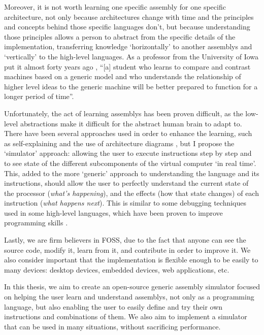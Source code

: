 Moreover, it is not worth learning one specific \gls{assembly} for one specific architecture, not only because architectures change with time and the principles and concepts behind those specific languages don't, but because understanding those principles allows a person to abstract from the specific details of the implementation, transferring knowledge `horizontally' to another \glspl{assembly} and `vertically' to the \glspl{high-level language}. As a professor from the University of Iowa put it almost forty years ago \parencite{DeckerWilliamF.1985Amat}, ``[a] student who learns to compare and contrast machines based on a generic model and who understands the relationship of higher level ideas to the generic machine will be better prepared to function for a longer period of time''.


Unfortunately, the act of learning \glspl{assembly} has been proven difficult, as the low-level abstractions make it difficult for the abstract human brain to adapt to. There have been several approaches used in order to enhance the learning, such as self-explaining and the use of architecture diagrams  \parencite{HungY.-C2012CSWC}, but I propose the `simulator' approach: allowing the user to execute instructions step by step and to see state of the different subcomponents of the virtual \gls{computer} `in real time'. This, added to the more `generic' approach to understanding the language and its instructions, should allow the user to perfectly understand the current state of the processor (\textit{what's happening}), and the effects (how that state changes) of each instruction (\textit{what happens next}). This is similar to some \gls{debugging} techniques used in some \glspl{high-level language}, which have been proven to improve programming skills \parencite{KLAHR1988362}.


Lastly, we are firm believers in \gls{FOSS}, due to the fact that anyone can see the source code, modify it, learn from it, and contribute in order to improve it. We also consider important that the implementation is flexible enough to be easily  to many devices: \glspl{desktop device}, \glspl{embedded device}, \glspl{web application}, etc.


In this thesis, we aim to create an open-source generic \gls{assembly} simulator focused on helping the user learn and understand \glspl{assembly}, not only as a \gls{programming language}, but also enabling the user to easily define and try their own instructions and combinations of them. We also aim to implement a simulator that can be used in many situations, without sacrificing performance.




